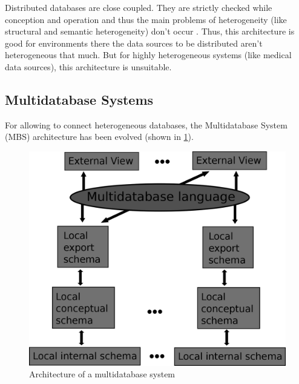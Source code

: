 Distributed databases are close coupled. They are strictly checked while conception and operation and thus the main problems of heterogeneity (like structural and semantic heterogeneity) don't occur \cite[p. 93]{DBLP:books/dp/LeserN2006}. Thus, this architecture is good for environments there the data sources to be distributed aren't heterogeneous that much. But for highly heterogeneous systems (like medical data sources), this architecture is unsuitable. 

\subsection{Multidatabase Systems}

For allowing to connect heterogeneous databases, the Multidatabase System (MBS) architecture has been evolved (shown in \ref{MBSDatabaseArchitecture}). 

\begin{figure}[H]
	\begin{center}
		\includegraphics[scale=0.5]{figures/MultidatabaseArchitecture.png}
	\end{center}
	\caption{Architecture of a  multidatabase system \cite[p. 94]{DBLP:books/dp/LeserN2006}}
	\label{MBSDatabaseArchitecture}
\end{figure}

